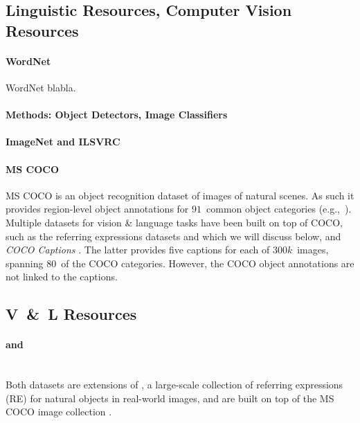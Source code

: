 \subsection{Linguistic Resources, Computer Vision Resources}

\paragraph{WordNet}
WordNet \cite{fellbaum1998wordnet} blabla. 

\paragraph{Methods: Object Detectors, Image Classifiers} 

\paragraph{ImageNet and ILSVRC}


\paragraph{MS COCO} \cite{mscoco}
MS COCO is an object recognition dataset of images of natural scenes. 
As such it provides region-level object annotations for $91$~common object categories (e.g.,~). 
Multiple datasets for vision \& language tasks have been built on top of COCO, such as the referring expressions datasets  and  which we will discuss below, and \textsl{COCO Captions} \cite{chen2015cococaptions}.  
The latter provides five captions for each of  $300k$~images, spanning $80$~of the COCO categories.  
However, the COCO object annotations are not linked to the captions.
\subsection{V\ \&\ L Resources}

\paragraph{ and  \cite{Yu2016}}~\\ 
Both datasets are extensions of \cite{Kazemzadeh2014}, a large-scale collection of referring expressions (RE) for natural objects in real-world images, and are built on top of the MS COCO image collection \cite{mscoco}. 

